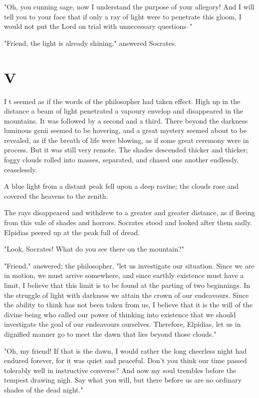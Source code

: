 "Oh, you cunning sage, now I understand the purpose of your allegory!
And I will tell you to your face that if only a ray of light were to
penetrate this gloom, I would not put the Lord on trial with
unnecessary questions--"

"Friend, the light is already shining," answered Socrates.



\section{V}


\lettrine[lines=3,lhang=0.11,lraise=0,loversize=0.05]{I}{}%
t seemed as if the words of the philosopher had taken effect. High up
in the distance a beam of light penetrated a vapoury envelop and
disappeared in the mountains. It was followed by a second and a third.
There beyond the darkness luminous genii seemed to be hovering, and a
great mystery seemed about to be revealed, as if the breath of life
were blowing, as if some great ceremony were in process. But it was
still very remote. The shades descended thicker and thicker; foggy
clouds rolled into masses, separated, and chased one another
endlessly, ceaselessly.

A blue light from a distant peak fell upon a deep ravine; the clouds
rose and covered the heavens to the zenith.

The rays disappeared and withdrew to a greater and greater distance,
as if fleeing from this vale of shades and horrors. Socrates stood and
looked after them sadly. Elpidias peered up at the peak full of dread.

"Look, Socrates! What do you see there on the mountain?"

"Friend," answered; the philosopher, "let us investigate our
situation. Since we are in motion, we must arrive somewhere, and since
earthly existence must have a limit, I believe that this limit is to
be found at the parting of two beginnings. In the struggle of light
with darkness we attain the crown of our endeavours. Since the ability
to think has not been taken from us, I believe that it is the will of
the divine being who called our power of thinking into existence that
we should investigate the goal of our endeavours ourselves. Therefore,
Elpidias, let us in dignified manner go to meet the dawn that lies
beyond those clouds."

"Oh, my friend! If that is the dawn, I would rather the long cheerless
night had endured forever, for it was quiet and peaceful. Don't you
think our time passed tolerably well in instructive converse? And now
my soul trembles before the tempest drawing nigh. Say what you will,
but there before us are no ordinary shades of the dead night."

